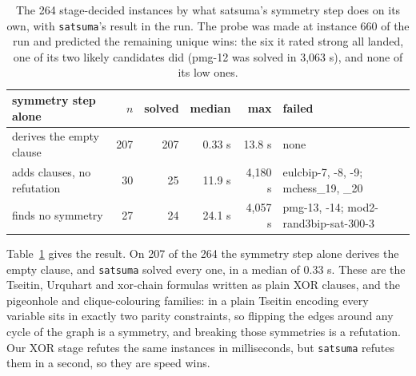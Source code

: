 \documentclass[10pt]{article}
\newcommand{\sats}{\texttt{satsuma}}
\begin{document}
\begin{table}[h]
\centering
\small
\begin{tabular}{lrrrrl}
\toprule
symmetry step alone & $n$ & solved & median & max & failed \\
\midrule
derives the empty clause & 207 & 207 & 0.33 s & 13.8 s & none \\
adds clauses, no refutation & 30 & 25 & 11.9 s & 4,180 s & eulcbip-7, -8, -9; mchess\_19, \_20 \\
finds no symmetry & 27 & 24 & 24.1 s & 4,057 s & pmg-13, -14; mod2-rand3bip-sat-300-3 \\
\bottomrule
\end{tabular}
\caption{The 264 stage-decided instances by what satsuma's symmetry step
does on its own, with \sats{}'s result in the run. The probe was made at
instance 660 of the run and predicted the remaining unique wins: the six
it rated strong all landed, one of its two likely candidates did
(pmg-12 was solved in 3,063 s), and none of its low ones.}
\label{tab:probe}
\end{table}

Table~\ref{tab:probe} gives the result. On 207 of the 264 the symmetry step
alone derives the empty clause, and \sats{} solved every one, in a median
of 0.33 s. These are the Tseitin, Urquhart and xor-chain formulas written
as plain XOR clauses, and the pigeonhole and clique-colouring families: in
a plain Tseitin encoding every variable sits in exactly two parity
constraints, so flipping the edges around any cycle of the graph is a
symmetry, and breaking those symmetries is a refutation. Our XOR stage
refutes the same instances in milliseconds, but \sats{} refutes them in a
second, so they are speed wins.
\end{document}
